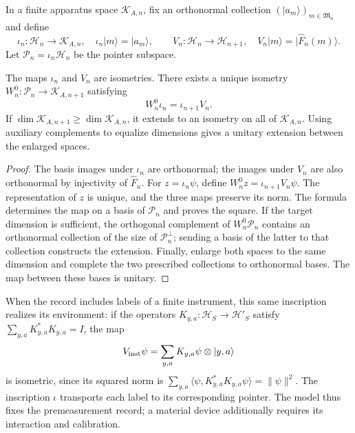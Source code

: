 In a finite apparatus space \(\mathcal K_{A,n}\), fix an
orthonormal collection \((|a_m\rangle)_{m\in\mathfrak M_n}\) and define
\[
 \iota_n:\mathcal H_n\longrightarrow\mathcal K_{A,n},
 \quad \iota_n|m\rangle=|a_m\rangle,
 \qquad
 V_n:\mathcal H_n\longrightarrow\mathcal H_{n+1},
 \quad V_n|m\rangle=|\widehat F_n(m)\rangle.
\]
Let \(\mathcal P_n=\iota_n\mathcal H_n\) be the pointer subspace.

\begin{theorem}
\label{vii:thm:observador-entrelazador}
The maps \(\iota_n\) and \(V_n\) are isometries. There exists a unique
isometry \(W_n^0:\mathcal P_n\longrightarrow\mathcal K_{A,n+1}\)
satisfying
\begin{equation}
 W_n^0\iota_n=\iota_{n+1}V_n.
 \label{vii:eq:observador-cuadrado}
\end{equation}
If \(\dim\mathcal K_{A,n+1}\geq\dim\mathcal K_{A,n}\),
it extends to an isometry on all of \(\mathcal K_{A,n}\).
Using auxiliary complements to equalize dimensions gives
a unitary extension between the enlarged spaces.
\end{theorem}

\begin{proof}
The basis images under \(\iota_n\) are orthonormal; the
images under \(V_n\) are also orthonormal by injectivity of
\(\widehat F_n\). For \(z=\iota_n\psi\), define
\(W_n^0z=\iota_{n+1}V_n\psi\). The representation of \(z\) is unique,
and the three maps preserve its norm. The formula determines the map
on a basis of \(\mathcal P_n\) and proves the square.
If the target dimension is sufficient, the orthogonal complement of
\(W_n^0\mathcal P_n\) contains an orthonormal collection of the size of
\(\mathcal P_n^\perp\); sending a basis of the latter to that collection
constructs the extension. Finally, enlarge both spaces to
the same dimension and complete the two prescribed collections to orthonormal
bases. The map between these bases is unitary.
\end{proof}

When the record includes labels of a finite instrument, this same
inscription realizes its environment: if the operators
\(K_{y,a}:\mathcal H_S\to\mathcal H'_S\) satisfy
\(\sum_{y,a}K_{y,a}^*K_{y,a}=I\), the map
\[
 V_{\rm inst}\psi=\sum_{y,a}K_{y,a}\psi\otimes|y,a\rangle
\]
is isometric, since its squared norm is
\(\sum_{y,a}\langle\psi,K_{y,a}^*K_{y,a}\psi\rangle=\|\psi\|^2\).
The inscription \(\iota\) transports each label to its corresponding
pointer. The model thus fixes the premeasurement record; a
material device additionally requires its interaction and calibration.

